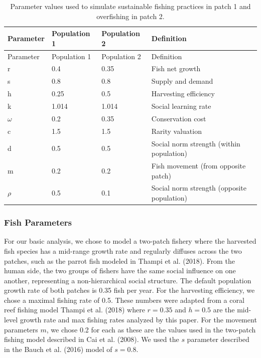\documentclass[
]{article}
\begin{document}
\begin{longtable}[]{@{}llll@{}}
\caption{\label{tab:DispersionParamTable}Parameter values used to simulate sustainable fishing practices in patch 1 and overfishing in patch 2. \label{DispersionParamTable}}\tabularnewline
\toprule()
Parameter & Population 1 & Population 2 & Definition \\
\midrule()
\endfirsthead
\toprule()
Parameter & Population 1 & Population 2 & Definition \\
\midrule()
\endhead
r & 0.4 & 0.35 & Fish net growth \\
s & 0.8 & 0.8 & Supply and demand \\
h & 0.25 & 0.5 & Harvesting efficiency \\
k & 1.014 & 1.014 & Social learning rate \\
\(\omega\) & 0.2 & 0.35 & Conservation cost \\
c & 1.5 & 1.5 & Rarity valuation \\
d & 0.5 & 0.5 & Social norm strength (within population) \\
m & 0.2 & 0.2 & Fish movement (from opposite patch) \\
\(\rho\) & 0.5 & 0.1 & Social norm strength (opposite population) \\
\bottomrule()
\end{longtable}

\hypertarget{fish-parameters}{%
\subsubsection{Fish Parameters}\label{fish-parameters}}

For our basic analysis, we chose to model a two-patch fishery where the harvested fish species has a mid-range growth rate and regularly diffuses across the two patches, such as the parrot fish modeled in Thampi et al. (2018). From the human side, the two groups of fishers have the same social influence on one another, representing a non-hierarchical social structure. The default population growth rate of both patches is 0.35 fish per year. For the harvesting efficiency, we chose a maximal fishing rate of 0.5. These numbers were adapted from a coral reef fishing model Thampi et al. (2018) where \(r = 0.35\) and \(h = 0.5\) are the mid-level growth rate and max fishing rates analyzed by this paper. For the movement parameters \(m\), we chose 0.2 for each as these are the values used in the two-patch fishing model described in Cai et al. (2008). We used the \(s\) parameter described in the Bauch et al. (2016) model of \(s = 0.8\).
\end{document}
